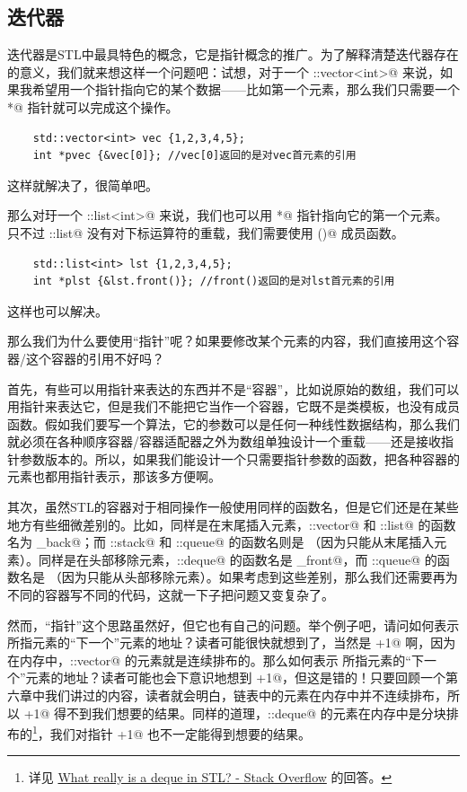 \subsection*{迭代器}
迭代器是STL中最具特色的概念，它是指针概念的推广。为了解释清楚迭代器存在的意义，我们就来想这样一个问题吧：试想，对于一个 \lstinline@std::vector<int>@ 来说，如果我希望用一个指针指向它的某个数据——比如第一个元素，那么我们只需要一个 \lstinline@int*@ 指针就可以完成这个操作。
\begin{lstlisting}
    std::vector<int> vec {1,2,3,4,5};
    int *pvec {&vec[0]}; //vec[0]返回的是对vec首元素的引用
\end{lstlisting}
这样就解决了，很简单吧。\par
那么对玗一个 \lstinline@std::list<int>@ 来说，我们也可以用 \lstinline@int*@ 指针指向它的第一个元素。只不过 \lstinline@std::list@ 没有对下标运算符的重载，我们需要使用 \lstinline@front()@ 成员函数。
\begin{lstlisting}
    std::list<int> lst {1,2,3,4,5};
    int *plst {&lst.front()}; //front()返回的是对lst首元素的引用
\end{lstlisting}
这样也可以解决。\par
那么我们为什么要使用``指针''呢？如果要修改某个元素的内容，我们直接用这个容器/这个容器的引用不好吗？\par
首先，有些可以用指针来表达的东西并不是``容器''，比如说原始的数组，我们可以用指针来表达它，但是我们不能把它当作一个容器，它既不是类模板，也没有成员函数。假如我们要写一个算法，它的参数可以是任何一种线性数据结构，那么我们就必须在各种顺序容器/容器适配器之外为数组单独设计一个重载——还是接收指针参数版本的。所以，如果我们能设计一个只需要指针参数的函数，把各种容器的元素也都用指针表示，那该多方便啊。\par
其次，虽然STL的容器对于相同操作一般使用同样的函数名，但是它们还是在某些地方有些细微差别的。比如，同样是在末尾插入元素，\lstinline@std::vector@ 和 \lstinline@std::list@ 的函数名为 \lstinline@push_back@；而 \lstinline@std::stack@ 和 \lstinline@std::queue@ 的函数名则是 \lstinline@pop@（因为只能从末尾插入元素）。同样是在头部移除元素，\lstinline@std::deque@ 的函数名是 \lstinline@pop_front@，而 \lstinline@std::queue@ 的函数名是 \lstinline@pop@（因为只能从头部移除元素）。如果考虑到这些差别，那么我们还需要再为不同的容器写不同的代码，这就一下子把问题又变复杂了。\par
然而，``指针''这个思路虽然好，但它也有自己的问题。举个例子吧，请问如何表示 \lstinline@pvec@ 所指元素的``下一个''元素的地址？读者可能很快就想到了，当然是 \lstinline@pvec+1@ 啊，因为在内存中，\lstinline@std::vector@ 的元素就是连续排布的。那么如何表示 \lstinline@plst@ 所指元素的``下一个''元素的地址？读者可能也会下意识地想到 \lstinline@plst+1@，但这是错的！只要回顾一个第六章中我们讲过的内容，读者就会明白，链表中的元素在内存中并不连续排布，所以 \lstinline@plst+1@ 得不到我们想要的结果。同样的道理，\lstinline@std::deque@ 的元素在内存中是分块排布的\footnote{详见 \href{https://stackoverflow.com/a/6292437/22112284}{What really is a deque in STL? - Stack Overflow} 的回答。}，我们对指针 \lstinline@+1@ 也不一定能得到想要的结果。\par
